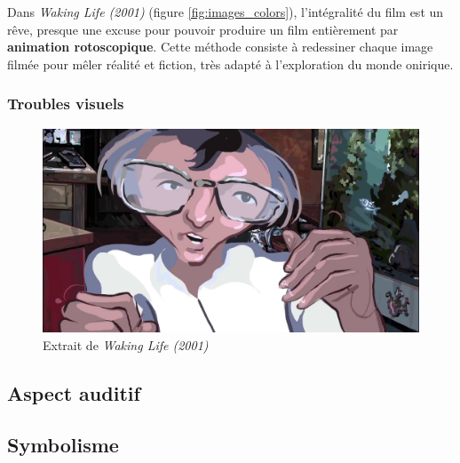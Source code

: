 \documentclass[../main.tex]{subfile}
\begin{document}
Dans \emph{Waking Life (2001)} (figure \ref{fig:images_colors}), l'intégralité
du film est un rêve, presque une excuse pour pouvoir produire un film
entièrement par \textbf{animation rotoscopique}. Cette méthode consiste à
redessiner chaque image filmée pour mêler réalité et fiction, très adapté à
l'exploration du monde onirique.

\subsubsection{Troubles visuels}

\begin{figure}[htpb]
    \centering
    \includegraphics[width=\linewidth]{images/telescopic}
    \caption{Extrait de \emph{Waking Life (2001)}}
    \label{fig:images_telescopic}
\end{figure}

\subsection{Aspect auditif}

\subsection{Symbolisme}
\end{document}

